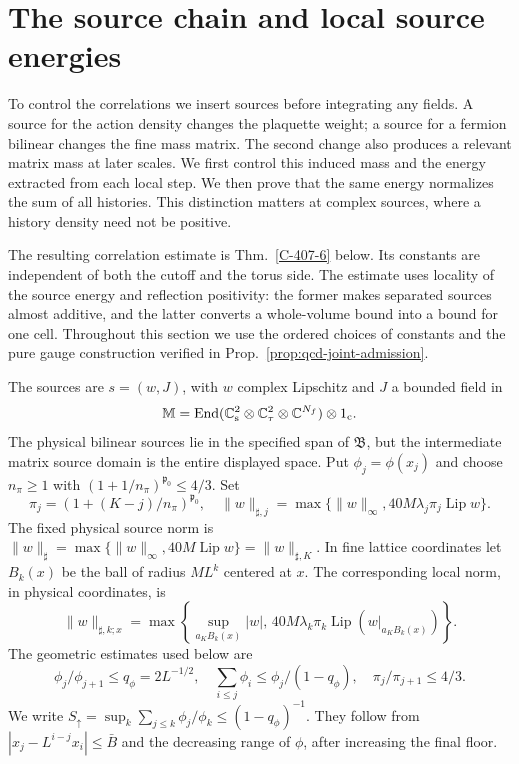 \documentclass[11pt,letterpaper,reqno]{amsart}
\theoremstyle{definition}
\theoremstyle{remark}
\begin{document}
\section{The source chain and local source energies}\label{sec:qcd-source-chain}

To control the correlations we insert sources before integrating any
fields.  A source for the action density changes the plaquette weight;
a source for a fermion bilinear changes the fine mass matrix.  The
second change also produces a relevant matrix mass at later scales.
We first control this induced mass and the energy extracted from each
local step.  We then prove that the same energy normalizes the sum of
all histories.  This distinction matters at complex sources, where a
history density need not be positive.

The resulting correlation estimate is Thm.~\ref{C-407-6} below.
Its constants are independent of both the cutoff and the torus side.
The estimate uses locality of the source energy and reflection
positivity: the former makes separated sources almost additive, and
the latter converts a whole-volume bound into a bound for one cell.
Throughout this section we use the ordered choices of constants
and the pure gauge construction verified in
Prop.~\ref{prop:qcd-joint-admission}.

The sources are $s=(w,J)$, with $w$ complex Lipschitz and $J$
a bounded field in
\[
 \mathbb M=\operatorname{End}(\mathbb C^2_{\rm s}\otimes
 \mathbb C^2_\tau\otimes\mathbb C^{N_f})\otimes1_{\rm c}.
\]
The physical bilinear sources lie in the specified span of
$\mathfrak B$, but the intermediate matrix source domain is
the entire displayed space. Put $\phi_j=\phi(x_j)$ and choose
$n_\pi\ge1$ with $(1+1/n_\pi)^{\mathfrak p_0}\le4/3$.
Set
\[
 \pi_j=(1+(K-j)/n_\pi)^{\mathfrak p_0},\quad
 \|w\|_{\sharp,j}=\max\{\|w\|_\infty,
                     40M\lambda_j\pi_j\operatorname{Lip}w\}.
\]
The fixed physical source norm is
$\|w\|_\sharp=\max\{\|w\|_\infty,40M\operatorname{Lip}w\}
=\|w\|_{\sharp,K}$.
In fine lattice coordinates let $B_k(x)$ be the ball of
radius $ML^k$ centered at $x$. The corresponding local norm, in physical coordinates, is
\[
 \|w\|_{\sharp,k;x}=\max\left\{
 \sup_{a_KB_k(x)}|w|,\,
 40M\lambda_k\pi_k\operatorname{Lip}(w|_{a_KB_k(x)})\right\}.
\]
The geometric estimates used below are
\begin{equation}\label{eq:qcd-source-geometry}
 \phi_j/\phi_{j+1}\le q_\phi=2L^{-1/2},\quad
 \sum_{i\le j}\phi_i\le\phi_j/(1-q_\phi),\quad
 \pi_j/\pi_{j+1}\le4/3.
\end{equation}
We write
$S_\uparrow=\sup_k\sum_{j\le k}\phi_j/\phi_k
\le(1-q_\phi)^{-1}$.
They follow from $|x_j-L^{i-j}x_i|\le\bar B$ and the
decreasing range of $\phi$, after increasing the final floor.
\end{document}
